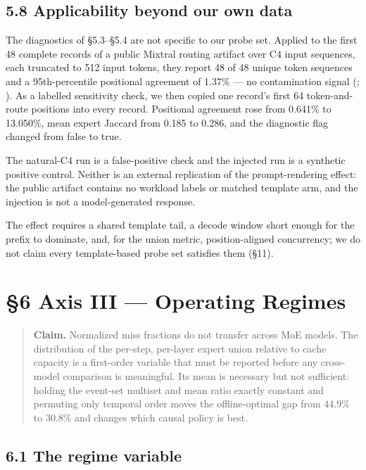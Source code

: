 \documentclass[
  10pt,
  letterpaper,
  10pt]{article}
\begin{document}
\subsection{5.8 Applicability beyond our own
data}\label{applicability-beyond-our-own-data}

The diagnostics of §5.3--§5.4 are not specific to our probe set. Applied
to the first 48 complete records of a public Mixtral routing artifact
over C4 input sequences, each truncated to 512 input tokens, they report
48 of 48 unique token sequences and a 95th-percentile positional
agreement of 1.37\% --- no contamination signal
(;
).
As a labelled sensitivity check, we then copied one record's first 64
token-and-route positions into every record. Positional agreement rose
from 0.641\% to 13.050\%, mean expert Jaccard from 0.185 to 0.286, and
the diagnostic flag changed from false to true.

The natural-C4 run is a false-positive check and the injected run is a
synthetic positive control. Neither is an external replication of the
prompt-rendering effect: the public artifact contains no workload labels
or matched template arm, and the injection is not a model-generated
response.

The effect requires a shared template tail, a decode window short enough
for the prefix to dominate, and, for the union metric, position-aligned
concurrency; we do not claim every template-based probe set satisfies
them (§11).

\section{§6 Axis III --- Operating
Regimes}\label{axis-iii-operating-regimes}

\begin{quote}
\textbf{Claim.} Normalized miss fractions do not transfer across MoE
models. The distribution of the per-step, per-layer expert union
relative to cache capacity is a first-order variable that must be
reported before any cross-model comparison is meaningful. Its mean is
necessary but not sufficient: holding the event-set multiset and mean
ratio exactly constant and permuting only temporal order moves the
offline-optimal gap from 44.9\% to 30.8\% and changes which causal
policy is best.
\end{quote}

\subsection{6.1 The regime variable}\label{the-regime-variable}
\end{document}
